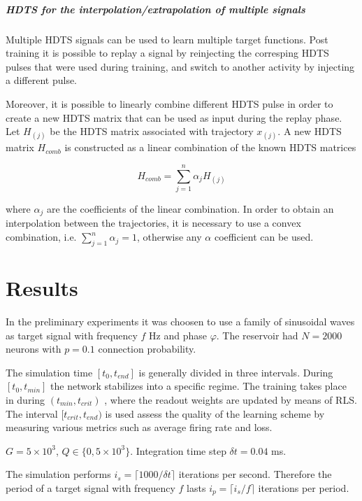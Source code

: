 \documentclass[10pt,a4paper, final]{report} %
\begin{document}
\paragraph{HDTS for the interpolation/extrapolation of multiple signals}
Multiple HDTS signals can be used to learn multiple target functions. Post training it is possible to replay a signal by reinjecting the corresping HDTS pulses that were used during training, and switch to another activity by injecting a different pulse. 

Moreover, it is possible to linearly combine different HDTS pulse in order to create a new HDTS matrix that can be used as input during the replay phase.
Let $H_{(j)}$ be the HDTS matrix associated with trajectory $x_{(j)}$. A new HDTS matrix $H_{comb}$ is constructed as a linear combination of the known HDTS matrices 

\begin{equation}
H_{comb} = \sum_{j=1}^n \alpha_j H_{(j)}
\end{equation}

where $\alpha_j$ are the coefficients of the linear combination. In order to obtain an interpolation between the trajectories, it is necessary to use a convex combination, i.e. $\sum_{j=1}^n \alpha_j = 1$, otherwise any $\alpha$ coefficient can be used.




\chapter{Results}
\label{cap:result}
In the preliminary experiments it was choosen to use a family of sinusoidal waves as target signal with frequency $f$ Hz and phase $\varphi$. The reservoir had $N=2000$ neurons with $p=0.1$ connection probability.  

The simulation time $[t_0, t_{end}]$ is generally divided in three intervals. During $[t_0, t_{min}]$ the network stabilizes into a specific regime. The training takes place in during $(t_{min}, t_{crit})$ , where the readout weights are updated by means of RLS. The interval $[t_{crit}, t_{end})$ is used assess the quality of the learning scheme by measuring various metrics such as average firing rate and loss.

$G = 5 \times 10^3$, $Q \in \{0, 5 \times 10^3\}$. Integration time step $\delta t = 0.04$ ms.

The simulation performs $i_s = \lceil 1000 / \delta t \rceil$ iterations per second. Therefore the period of a target signal with frequency $f$ lasts $i_p = \lceil i_s / f \rceil$ iterations per period.
\end{document}
